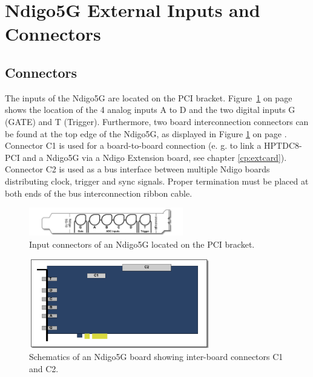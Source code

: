 \section{Ndigo5G External Inputs and Connectors}
\subsection{Connectors}
%
The inputs of the Ndigo5G are located on the PCI bracket. Figure~\ref{fig:schematics} on page~\pageref{fig:schematics} shows the location of the 4 analog inputs A to D and the two digital inputs G (GATE) and T (Trigger). Furthermore, two board interconnection connectors can be found at the top edge of the Ndigo5G, as displayed in  Figure \ref{fig:schematics} on page \pageref{fig:schematics}. Connector C1 is used for a board-to-board connection (e. g. to link a HPTDC8-PCI and a Ndigo5G via a Ndigo Extension board, see chapter \ref{cp:extcard}). Connector C2 is used as a bus interface between multiple Ndigo boards distributing clock, trigger and sync signals. Proper termination must be placed at both ends of the bus interconnection ribbon cable.	
%
\begin{figure}[hb]
    \centering
    \includegraphics[width=0.6\textwidth]{figures/Ndigo-Slotblende.pdf}
    \caption{Input connectors of an Ndigo5G located on the PCI bracket.}
\end{figure}
%
\begin{figure}[ht]
    \centering
    \includegraphics[width=0.7\textwidth]{figures/Ndigo_schematic.pdf}
    \caption{Schematics of an Ndigo5G board showing inter-board connectors C1 and C2.\label{fig:schematics}}
\end{figure}
%
%
%
